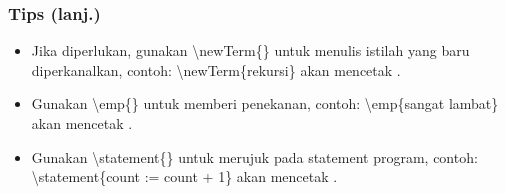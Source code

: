 \begin{frame}
\frametitle{Tips (lanj.)}
\begin{itemize}
  \item Jika diperlukan, gunakan \textbackslash newTerm\{\} untuk menulis istilah yang baru diperkanalkan, contoh: \textbackslash newTerm\{rekursi\} akan mencetak .
  \item Gunakan \textbackslash emp\{\} untuk memberi penekanan, contoh: \textbackslash emp\{sangat lambat\} akan mencetak .
  \item Gunakan \textbackslash statement\{\} untuk merujuk pada statement program, contoh: \textbackslash statement\{count := count + 1\} akan mencetak .
\end{itemize}
\end{frame}


